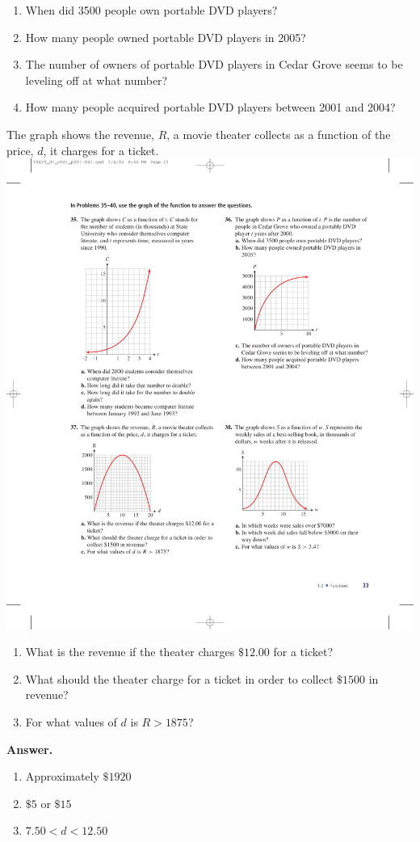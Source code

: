 \documentclass[10pt,]{book}
\theoremstyle{plain}
\theoremstyle{definition}
\theoremstyle{definition}
\theoremstyle{definition}
\theoremstyle{definition}
\numberwithin{equation}{part}
\newcommand{\lt}{<}
\newcommand{\gt}{>}
\begin{document}
\begin{exerciselist}
\begin{exercisegroup}
\leavevmode%
\begin{enumerate}[label=\alph*]
\item\hypertarget{li-383}{}When did 3500 people own portable DVD players?%
\item\hypertarget{li-384}{}How many people owned portable DVD players in 2005?%
\item\hypertarget{li-385}{}The number of owners of portable DVD players in Cedar Grove seems to be leveling off at what number?%
\item\hypertarget{li-386}{}How many people acquired portable DVD players between 2001 and 2004?%
\end{enumerate}
\exercise[37.]\hypertarget{exercise-106}{}The graph shows the revenue, \(R\), a movie theater collects as a function of the price, \(d\), it charges for a ticket.%
\includegraphics[width=0.5\linewidth]{images/fig-ex-1-2-37}
\leavevmode%
\begin{enumerate}[label=\alph*]
\item\hypertarget{li-387}{}What is the revenue if the theater charges \(\$12.00\) for a ticket?%
\item\hypertarget{li-388}{}What should the theater charge for a ticket in order to collect \(\$1500\) in revenue?%
\item\hypertarget{li-389}{}For what values of \(d\) is \(R\gt 1875\)?%
\end{enumerate}
\par\smallskip
\noindent\textbf{Answer.}\hypertarget{answer-62}{}\quad
\leavevmode%
\begin{enumerate}[label=\alph*]
\item\hypertarget{li-390}{}Approximately \(\$1920\)%
\item\hypertarget{li-391}{}\(\$5\) or \(\$15\)%
\item\hypertarget{li-392}{}\(7.50\lt d\lt 12.50\)%

\end{enumerate}
\end{exercisegroup}
\end{exerciselist}
\end{document}
